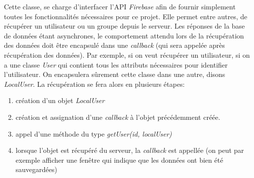 Cette classe, se charge d'interfacer l'API \textit{Firebase} afin de fournir simplement toutes les fonctionnalités nécessaires pour
ce projet. Elle permet entre autres, de récupérer un utilisateur ou un groupe depuis le serveur. Les réponses de la base de
données étant asynchrones, le comportement attendu lors de la récupération des données doit être encapsulé dans une
\textit{callback} (qui sera appelée après récupération des données). Par exemple, si on veut récupérer un utilisateur, si on a une
classe \textit{User} qui contient tous les attributs nécessaires pour identifier l'utilisateur. On encapsulera sûrement cette
classe dans une autre, disons \textit{LocalUser}. La récupération se fera alors en plusieurs étapes:
\begin{enumerate}
    \item création d'un objet \textit{LocalUser}
    \item création et assignation d'une \textit{callback} à l'objet précédemment créée.
    \item appel d'une méthode du type \textit{getUser(id, localUser)}
    \item lorsque l'objet est récupéré du serveur,  la \textit{callback} est appellée (on peut par exemple afficher une fenêtre
        qui indique que les données ont bien été sauvegardées)
\end{enumerate}
